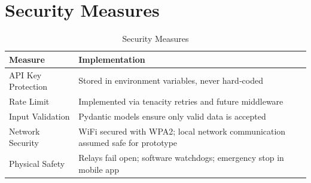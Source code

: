 \section{Security Measures}
\begin{table}[H]
    \centering
    \small
    \begin{tabularx}{\textwidth}{|l|X|}
        \hline
        \textbf{Measure} & \textbf{Implementation} \\
        \hline
        API Key Protection & Stored in environment variables, never hard‑coded \\
        \hline
        Rate Limit & Implemented via tenacity retries and future middleware \\
        \hline
        Input Validation & Pydantic models ensure only valid data is accepted \\
        \hline
        Network Security & WiFi secured with WPA2; local network communication assumed safe for prototype \\
        \hline
        Physical Safety & Relays fail open; software watchdogs; emergency stop in mobile app \\
        \hline
    \end{tabularx}
    \caption{Security Measures}
    \label{tab:security}
\end{table}
